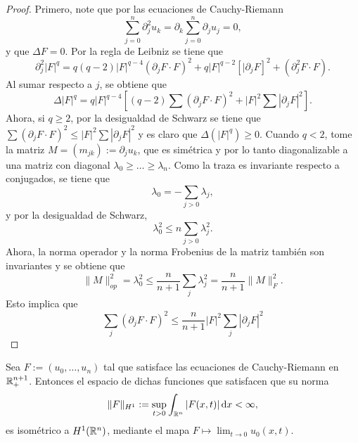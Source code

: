 \begin{proof}
	Primero, note que por las ecuaciones de Cauchy-Riemann
	\begin{equation*}
		\sum_{j=0}^n \partial_j^2 u_k = \partial_k\sum_{j=0}^n \partial_ju_j = 0,
	\end{equation*}
	y que $\Delta F=0$. Por la regla de Leibniz se tiene que
	\begin{equation*}
		\partial_j^2 |F|^q = q(q-2)|F|^{q-4}(\partial_j F\cdot F)^2 + q|F|^{q-2}[|\partial_jF]^2 + (\partial^2_jF\cdot F).
	\end{equation*}
	Al sumar respecto a $j$, se obtiene que
	\begin{equation*}
		\Delta|F|^q = q|F|^{q-4} \left[ (q-2)\sum (\partial_jF\cdot F)^2 + |F|^2\sum |\partial_jF|^2
		\right].
	\end{equation*}
	Ahora, si $q\geq2$, por la desigualdad de Schwarz se tiene que $\sum(\partial_jF\cdot F)^2 \leq |F|^2\sum|\partial_jF|^2$ y es claro que $\Delta(|F|^q)\geq 0$. Cuando $q<2$, tome la matriz $M=(m_{jk}) := \partial_ju_k$, que es simétrica y por lo tanto diagonalizable a una matriz con diagonal $\lambda_0\geq\ldots\geq\lambda_n$. Como la traza es invariante respecto a conjugados, se tiene que
	\begin{equation*}
		\lambda_0 = -\sum_{j>0}\lambda_j,
	\end{equation*}
	y por la desigualdad de Schwarz,
	\begin{equation*}
		\lambda_0^2 \leq n \sum_{j>0} \lambda_j^2.
	\end{equation*}
	Ahora, la norma operador y la norma Frobenius de la matriz también son invariantes y se obtiene que 
	\begin{equation*}
		\|M\|_{op}^2 = \lambda_0^2 \leq \frac{n}{n+1} \sum_{j}\lambda_j^2 = \frac{n}{n+1} \|M\|_{F}^2.
	\end{equation*}
	Esto implica que 
	\begin{equation*}
		\sum_j(\partial_jF\cdot F)^2 \leq \frac{n}{n+1}  |F|^2\sum_j|\partial_jF|^2
	\end{equation*}
\end{proof}
\begin{theorem}\label{theo:H1-F}
	Sea $F:=(u_0, \ldots, u_n)$ tal que satisface las ecuaciones de Cauchy-Riemann en $\mathbb{R}^{n+1}_+$. Entonces el espacio de dichas funciones que satisfacen que su norma 
	\begin{equation*}
		\|F\|_{H^1} := \sup_{t>0} \int_{\mathbb{R}^n} |F(x, t)| \mathop{}\!\mathrm{d} x < \infty,
	\end{equation*}
	es isométrico a $H^1(\mathbb{R}^n)$, mediante el mapa $F \mapsto \lim_{t\to0}u_0(x, t)$.
\end{theorem}
